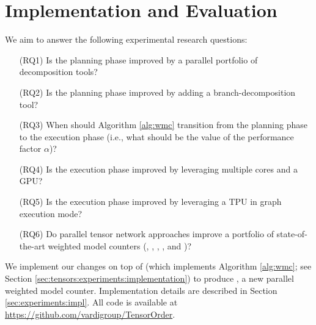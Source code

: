 \section{Implementation and Evaluation}
\label{sec:experiments}

We aim to answer the following experimental research questions:
\begin{enumerate}\itemsep0em 
    \item[(RQ1)] Is the planning phase improved by a parallel portfolio of decomposition tools?
    
    \item[(RQ2)] Is the planning phase improved by adding a branch-decomposition tool?
    
    \item[(RQ3)] When should Algorithm \ref{alg:wmc} transition from the planning phase to the execution phase (i.e., what should be the value of the performance factor $\alpha$)?
    
    \item[(RQ4)] Is the execution phase improved by leveraging multiple cores and a GPU?
    
    \item[(RQ5)] Is the execution phase improved by leveraging a TPU in graph execution mode?
    
    \item[(RQ6)] Do parallel tensor network approaches improve a portfolio of state-of-the-art weighted model counters (, , , , and )?
\end{enumerate}

We implement our changes on top of  (which implements Algorithm \ref{alg:wmc}; see Section \ref{sec:tensors:experiments:implementation}) to produce , a new parallel weighted model counter. Implementation details are described in Section \ref{sec:experiments:impl}. All code is available at  \url{https://github.com/vardigroup/TensorOrder}.

